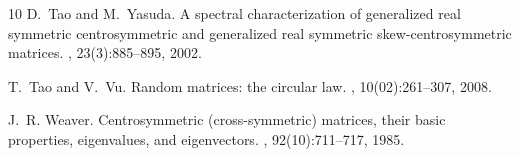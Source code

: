 \documentclass[12pt]{amsart}
\theoremstyle{plain}
\theoremstyle{definition}
\begin{document}
\begin{thebibliography}{10}
D.~Tao and M.~Yasuda.
\newblock A spectral characterization of generalized real symmetric
  centrosymmetric and generalized real symmetric skew-centrosymmetric matrices.
,
  23(3):885--895, 2002.

T.~Tao and V.~Vu.
\newblock Random matrices: the circular law.
, 10(02):261--307,
  2008.

J.~R. Weaver.
\newblock Centrosymmetric (cross-symmetric) matrices, their basic properties,
  eigenvalues, and eigenvectors.
, 92(10):711--717, 1985.

\end{thebibliography}
\end{document}
